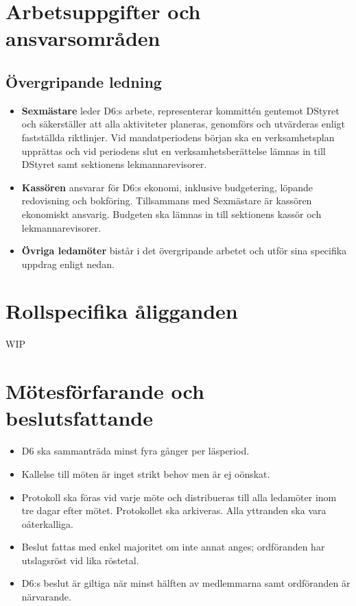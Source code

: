 \documentclass[a4paper]{dtekinstruktion}
\begin{document}
\section{Arbetsuppgifter och ansvarsområden}
\subsection{Övergripande ledning}
\begin{itemize}
  \item \textbf{Sexmästare} leder D6:s arbete, representerar kommittén gentemot DStyret och säkerställer att alla aktiviteter planeras, genomförs och utvärderas enligt fastställda riktlinjer. Vid mandatperiodens början ska en verksamhetsplan upprättas och vid periodens slut en verksamhetsberättelse lämnas in till DStyret samt sektionens lekmannarevisorer.
  \item \textbf{Kassören} ansvarar för D6:s ekonomi, inklusive budgetering, löpande redovisning och bokföring. Tillsammans med Sexmästare är kassören ekonomiskt ansvarig. Budgeten ska lämnas in till sektionens kassör och lekmannarevisorer.
  \item \textbf{Övriga ledamöter} bistår i det övergripande arbetet och utför sina specifika uppdrag enligt nedan.
\end{itemize}

\section{Rollspecifika åligganden}
WIP


\section{Mötesförfarande och beslutsfattande}
\begin{itemize}
  \item D6 ska sammanträda minst fyra gånger per läsperiod.
  \item Kallelse till möten är inget strikt behov men är ej oönskat.
  \item Protokoll ska föras vid varje möte och distribueras till alla ledamöter inom tre dagar efter mötet. Protokollet ska arkiveras. Alla yttranden ska vara oåterkalliga.
  \item Beslut fattas med enkel majoritet om inte annat anges; ordföranden har utslagsröst vid lika röstetal.
  \item D6:s beslut är giltiga när minst hälften av medlemmarna samt ordföranden är närvarande.
\end{itemize}
\end{document}
